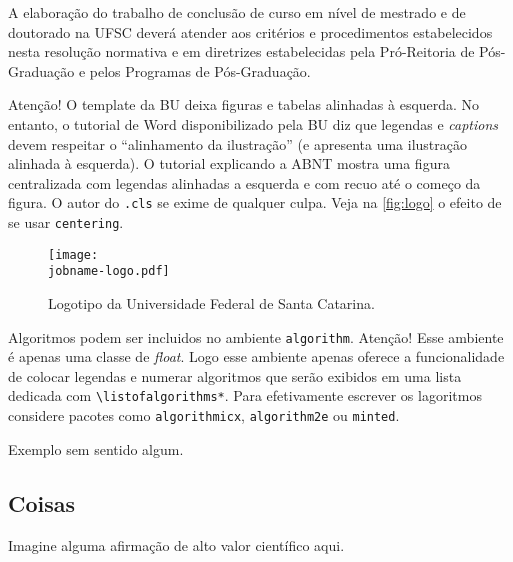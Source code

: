 \documentclass[
  english,
  lmodern,
  oneside
]{ufsc-thesis-rn46-2019/ufsc-thesis-rn46-2019}
\begin{document}
\begin{citacao}
  A elaboração do trabalho de conclusão de curso em nível de mestrado
  e de doutorado na UFSC deverá atender aos critérios e procedimentos
  estabelecidos nesta resolução normativa e em diretrizes
  estabelecidas pela Pró-Reitoria de Pós-Graduação e pelos Programas
  de Pós-Graduação.
\end{citacao}

Atenção! O template da BU deixa figuras e tabelas alinhadas à esquerda. No
entanto, o tutorial de Word disponibilizado pela BU diz que legendas e
\emph{captions} devem respeitar o ``alinhamento da ilustração'' (e apresenta
uma ilustração alinhada à esquerda). O tutorial explicando a ABNT mostra uma
figura centralizada com legendas alinhadas a esquerda e com recuo até o começo
da figura. O autor do \texttt{.cls} se exime de qualquer culpa.
Veja na \autoref{fig:logo} o efeito de se usar \texttt{centering}.

\begin{figure}[t]
  \centering
  \caption{Logotipo da Universidade Federal de Santa Catarina.}
  \label{fig:logo}

  \texttt{[image: \\jobname-logo.pdf]}
\end{figure}

Algoritmos podem ser incluidos no ambiente \texttt{algorithm}. Atenção! Esse
ambiente é apenas uma classe de \emph{float}. Logo esse ambiente apenas oferece
a funcionalidade de colocar legendas e numerar algoritmos que serão exibidos em
uma lista dedicada com \texttt{\textbackslash{}listofalgorithms*}. Para
efetivamente escrever os lagoritmos considere pacotes como
\texttt{algorithmicx}, \texttt{algorithm2e} ou \texttt{minted}.

\begin{algorithm}
  \centering
  \caption{Exemplo sem sentido algum.}


\end{algorithm}

\subsection{Coisas}
\label{sec:stuff}
Imagine alguma afirmação de alto valor científico aqui.
\end{document}
